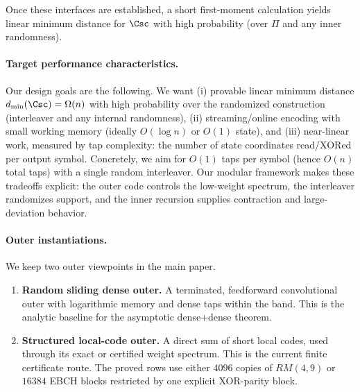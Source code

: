Once these interfaces are established, a short first-moment calculation yields linear minimum distance for \(\Csc\) with high probability
(over \(\Pi\) and any inner randomness).

\paragraph{Target performance characteristics.}
Our design goals are the following.
We want (i) provable linear minimum distance \(d_{\min}(\Csc)=\Omega(n)\) with high probability over the randomized construction
(interleaver and any internal randomness), (ii) streaming/online encoding with small working memory (ideally \(O(\log n)\) or \(O(1)\) state),
and (iii) near-linear work, measured by tap complexity: the number of state coordinates read/XORed per output symbol.
Concretely, we aim for \(O(1)\) taps per symbol (hence \(O(n)\) total taps) with a single random interleaver.
Our modular framework makes these tradeoffs explicit: the outer code controls the low-weight spectrum, the interleaver randomizes support,
and the inner recursion supplies contraction and large-deviation behavior.


\paragraph{Outer instantiations.}
We keep two outer viewpoints in the main paper.
\begin{enumerate}
\item \textbf{Random sliding dense outer.}
A terminated, feedforward convolutional outer with logarithmic memory and dense taps within the band.  This is the
analytic baseline for the asymptotic dense+dense theorem.
\item \textbf{Structured local-code outer.}
A direct sum of short local codes, used through its exact or certified weight spectrum.  This is the current finite
certificate route.  The proved rows use either \(4096\) copies of \(RM(4,9)\)
or \(16384\) EBCH blocks restricted by one explicit XOR-parity block.
\end{enumerate}

